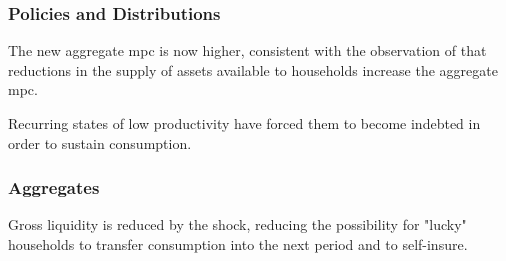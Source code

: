 \documentclass[12pt]{article} %
\numberwithin{equation}{section} %
\begin{document}
\subsubsection*{Policies and Distributions}

The new aggregate \Gls{mpc} is now higher, consistent with the observation of \textcite{kaplan2018} that reductions in the supply of assets available to households increase the aggregate \Gls{mpc}.

Recurring states of low productivity have forced them to become indebted in order to sustain consumption.


\subsubsection*{Aggregates}

Gross liquidity is reduced by the shock, reducing the possibility for "lucky" households to transfer consumption into the next period and to self-insure.
\end{document}
